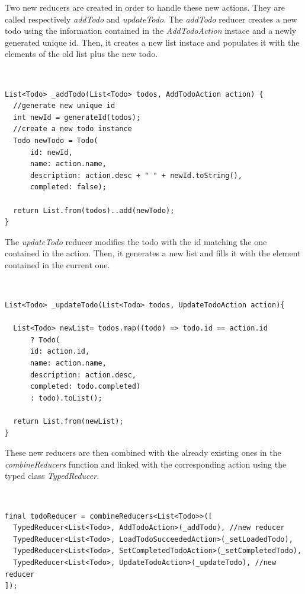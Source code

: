 Two new reducers are created in order to handle these new actions. They are called respectively \textit{addTodo} and \textit{updateTodo}. The \textit{addTodo} reducer  creates a new todo using the information contained in the \textit{AddTodoAction}  instace and a newly generated unique id. Then, it creates a new list instace and populates it with the elements of the old list plus the new todo.
\begin{code}
\mbox{}\\
 \mbox{}
		\label{code:2.14}
\begin{verbatim}
List<Todo> _addTodo(List<Todo> todos, AddTodoAction action) {
  //generate new unique id
  int newId = generateId(todos);
  //create a new todo instance
  Todo newTodo = Todo(
      id: newId,
      name: action.name,
      description: action.desc + " " + newId.toString(),
      completed: false);

  return List.from(todos)..add(newTodo);
}
\end{verbatim}
\mbox{}
\end{code}

The \textit{updateTodo} reducer modifies the todo with the id matching the one contained in the action. Then, it generates a new list and fills it with the element contained in the current one.
\begin{code}
\mbox{}\\
 \mbox{}
		\label{code:2.14}
\begin{verbatim}
List<Todo> _updateTodo(List<Todo> todos, UpdateTodoAction action){

  List<Todo> newList= todos.map((todo) => todo.id == action.id
      ? Todo(
      id: action.id,
      name: action.name,
      description: action.desc,
      completed: todo.completed)
      : todo).toList();

  return List.from(newList);
}
\end{verbatim}
\mbox{}
\end{code}

These new reducers are then combined with the already existing ones in the \textit{combineReducers} function and linked with the corresponding action using the typed class \textit{TypedReducer}.
\begin{code}
\mbox{}\\
 \mbox{}
		\label{code:2.14}
\begin{verbatim}
final todoReducer = combineReducers<List<Todo>>([
  TypedReducer<List<Todo>, AddTodoAction>(_addTodo), //new reducer
  TypedReducer<List<Todo>, LoadTodoSucceededAction>(_setLoadedTodo),
  TypedReducer<List<Todo>, SetCompletedTodoAction>(_setCompletedTodo),
  TypedReducer<List<Todo>, UpdateTodoAction>(_updateTodo), //new reducer
]);
\end{verbatim}
\mbox{}
\end{code}

